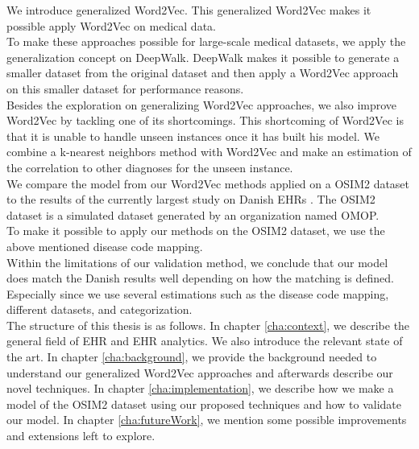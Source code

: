 We introduce generalized Word2Vec. This generalized Word2Vec makes it possible apply Word2Vec on medical data. \\
To make these approaches possible for large-scale medical datasets, we apply the generalization concept on DeepWalk. DeepWalk makes it possible to generate a smaller dataset from the original dataset and then apply a Word2Vec approach on this smaller dataset for performance reasons. \\
Besides the exploration on generalizing Word2Vec approaches, we also improve Word2Vec by tackling one of its shortcomings. This shortcoming of Word2Vec is that it is unable to handle unseen instances once it has built his model. We combine a k-nearest neighbors method with Word2Vec and make an estimation of the correlation to other diagnoses for the unseen instance. \\

We compare the model from our Word2Vec methods applied on a OSIM2 dataset to the results of the currently largest study on Danish EHRs \cite{Brunak:article}. The OSIM2 dataset is a simulated dataset generated by an organization named OMOP. \\
To make it possible to apply our methods on the OSIM2 dataset, we use the above mentioned disease code mapping. \\

Within the limitations of our validation method, we conclude that our model does match the Danish results well depending on how the matching is defined. Especially since we use several estimations such as the disease code mapping, different datasets, and categorization. \\

The structure of this thesis is as follows. In chapter \ref{cha:context}, we describe the general field of EHR and EHR analytics. We also introduce the relevant state of the art. In chapter \ref{cha:background}, we provide the background needed to understand our generalized Word2Vec approaches and afterwards describe our novel techniques. In chapter \ref{cha:implementation}, we describe how we make a model of the OSIM2 dataset using our proposed techniques and how to validate our model. In chapter \ref{cha:futureWork}, we mention some possible improvements and extensions left to explore.


